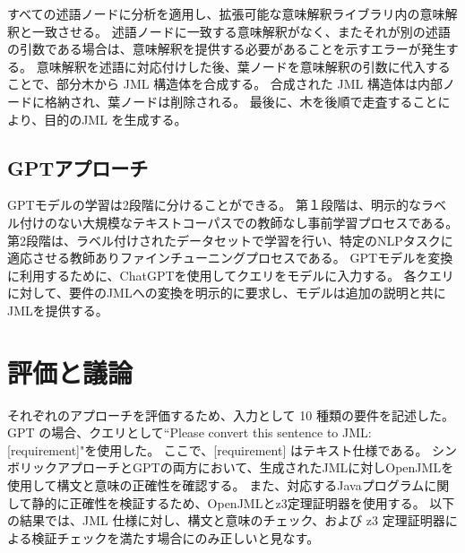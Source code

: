 \documentclass[uplatex, twocolumn, 10pt]{jsarticle} %
\begin{document}
すべての述語ノードに分析を適用し、拡張可能な意味解釈ライブラリ内の意味解釈と一致させる。
述語ノードに一致する意味解釈がなく、またそれが別の述語の引数である場合は、意味解釈を提供する必要があることを示すエラーが発生する。
意味解釈を述語に対応付けした後、葉ノードを意味解釈の引数に代入することで、部分木から JML 構造体を合成する。
合成された JML 構造体は内部ノードに格納され、葉ノードは削除される。
最後に、木を後順で走査することにより、目的のJML を生成する。

\subsection{GPTアプローチ}
GPTモデル\cite{2}の学習は2段階に分けることができる。
第１段階は、明示的なラベル付けのない大規模なテキストコーパスでの教師なし事前学習プロセスである。
第2段階は、ラベル付けされたデータセットで学習を行い、特定のNLPタスクに適応させる教師ありファインチューニングプロセスである。
GPTモデルを変換に利用するために、ChatGPTを使用してクエリをモデルに入力する。
各クエリに対して、要件のJMLへの変換を明示的に要求し、モデルは追加の説明と共にJMLを提供する。

\section{評価と議論}
\label{sec:evaluation}
それぞれのアプローチを評価するため、入力として 10 種類の要件を記述した。
GPT の場合、クエリとして``Please convert this sentence to JML: [requirement]"を使用した。
ここで、[requirement] はテキスト仕様である。
シンボリックアプローチとGPTの両方において、生成されたJMLに対しOpenJML\cite{4}を使用して構文と意味の正確性を確認する。
また、対応するJavaプログラムに関して静的に正確性を検証するため、OpenJMLとz3\cite{5}定理証明器を使用する。
以下の結果では、JML 仕様に対し、構文と意味のチェック、および z3 定理証明器による検証チェックを満たす場合にのみ正しいと見なす。
\end{document}
